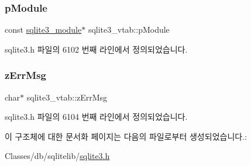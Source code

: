 \subsubsection{\texorpdfstring{p\+Module}{pModule}}
{\footnotesize\ttfamily const \hyperlink{structsqlite3__module}{sqlite3\+\_\+module}$\ast$ sqlite3\+\_\+vtab\+::p\+Module}



sqlite3.\+h 파일의 6102 번째 라인에서 정의되었습니다.

\mbox{\label{structsqlite3__vtab_afc50eadfdd7cef876633d460deba48d6}} 
\subsubsection{\texorpdfstring{z\+Err\+Msg}{zErrMsg}}
{\footnotesize\ttfamily char$\ast$ sqlite3\+\_\+vtab\+::z\+Err\+Msg}



sqlite3.\+h 파일의 6104 번째 라인에서 정의되었습니다.



이 구조체에 대한 문서화 페이지는 다음의 파일로부터 생성되었습니다.\+:\begin{DoxyCompactItemize}
\item 
Classes/db/sqlitelib/\hyperlink{sqlite3_8h}{sqlite3.\+h}\end{DoxyCompactItemize}
